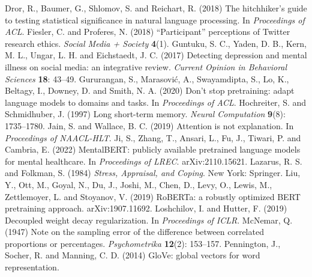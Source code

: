 \begin{thebibliography}{}
 Dror, R., Baumer, G., Shlomov, S. and Reichart, R. (2018) The hitchhiker's guide to testing
 statistical significance in natural language processing. In {\it Proceedings of ACL}.
 Fiesler, C. and Proferes, N. (2018) ``Participant'' perceptions of Twitter research ethics.
 {\it Social Media + Society} {\bf 4}(1).
 Guntuku, S. C., Yaden, D. B., Kern, M. L., Ungar, L. H. and Eichstaedt, J. C. (2017) Detecting
 depression and mental illness on social media: an integrative review. {\it Current Opinion in
 Behavioral Sciences} {\bf 18}: 43--49.
 Gururangan, S., Marasovi\'c, A., Swayamdipta, S., Lo, K., Beltagy, I., Downey, D. and Smith, N. A.
 (2020) Don't stop pretraining: adapt language models to domains and tasks. In {\it Proceedings of ACL}.
 Hochreiter, S. and Schmidhuber, J. (1997) Long short-term memory. {\it Neural Computation} {\bf 9}(8): 1735--1780.
 Jain, S. and Wallace, B. C. (2019) Attention is not explanation. In {\it Proceedings of NAACL-HLT}.
 Ji, S., Zhang, T., Ansari, L., Fu, J., Tiwari, P. and Cambria, E. (2022) MentalBERT: publicly available
 pretrained language models for mental healthcare. In {\it Proceedings of LREC}. arXiv:2110.15621.
 Lazarus, R. S. and Folkman, S. (1984) {\it Stress, Appraisal, and Coping}. New York: Springer.
 Liu, Y., Ott, M., Goyal, N., Du, J., Joshi, M., Chen, D., Levy, O., Lewis, M., Zettlemoyer, L. and
 Stoyanov, V. (2019) RoBERTa: a robustly optimized BERT pretraining approach. arXiv:1907.11692.
 Loshchilov, I. and Hutter, F. (2019) Decoupled weight decay regularization. In {\it Proceedings of
 ICLR}.
 McNemar, Q. (1947) Note on the sampling error of the difference between correlated proportions or
 percentages. {\it Psychometrika} {\bf 12}(2): 153--157.
 Pennington, J., Socher, R. and Manning, C. D. (2014) GloVe: global vectors for word representation.

\end{thebibliography}

